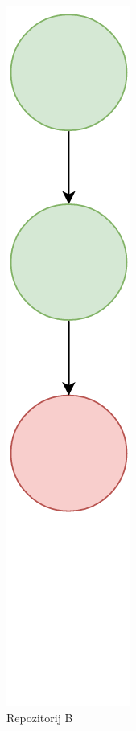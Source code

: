 \documentclass[times, utf8, diplomski, numeric]{fer}
\begin{document}
\begin{figure}[b!]
\begin{subfigure}{.24\textwidth}
\includegraphics[scale=0.4]{VersioningTreeC}
\caption{Repozitorij B}
\label{fig:VersioningTreeC}
\end{subfigure}
\begin{subfigure}{.24\textwidth}
\centering

\end{subfigure}
\end{figure}
\end{document}
